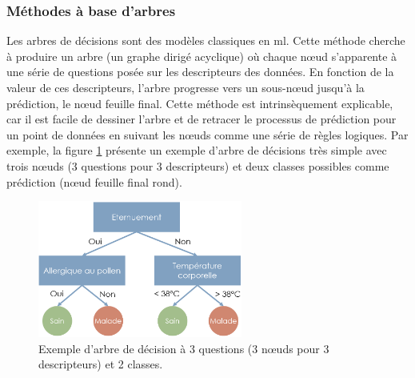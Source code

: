 \subsubsection{Méthodes à base d'arbres}
Les arbres de décisions sont des modèles classiques en \gls{ml}. Cette méthode cherche à produire un arbre (un graphe dirigé acyclique) où chaque nœud s'apparente à une série de questions posée sur les descripteurs des données. En fonction de la valeur de ces descripteurs, l'arbre progresse vers un sous-nœud jusqu'à la prédiction, le nœud feuille final. Cette méthode est intrinsèquement explicable, car il est facile de dessiner l'arbre et de retracer le processus de prédiction pour un point de données en suivant les nœuds comme une série de règles logiques. Par exemple, la figure \ref{fig:decision-tree} présente un exemple d'arbre de décisions très simple avec trois nœuds (3 questions pour 3 descripteurs) et deux classes possibles comme prédiction (nœud feuille final rond).
\begin{figure}[!ht]
 \centering
 \includegraphics[width=0.6\textwidth]{figures/decision_tree.png}
 \caption[Exemple d'arbre de décision]{Exemple d'arbre de décision à 3 questions (3 nœuds pour 3 descripteurs) et 2 classes.}
 \label{fig:decision-tree}
\end{figure}

